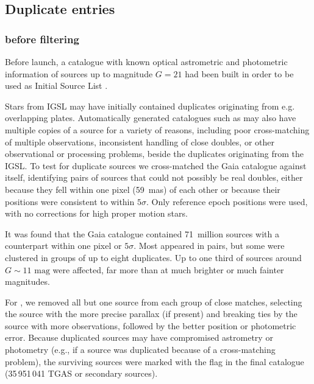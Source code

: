 \subsection{Duplicate entries}

\subsubsection{{} before filtering}\label{sec:duplicates}

Before launch, a catalogue with known optical astrometric and photometric information 
of sources up to magnitude $G=21$ had been built in order to be used as
Initial {\gaia} Source List \citep[IGSL,][]{2014A&A...570A..87S}.

Stars from IGSL may have initially contained duplicates originating from e.g. overlapping plates.
Automatically generated catalogues such as {} may also have multiple copies of a source for a variety of reasons, including poor cross-matching of multiple observations, inconsistent handling of close doubles, or other observational or processing problems, beside the duplicates originating from the IGSL. 
To test for duplicate sources we cross-matched the Gaia catalogue against itself, identifying pairs of sources that could not possibly be real doubles, either because they fell within one pixel (59~mas) of each other or because their positions were consistent to within $5\sigma$. Only reference epoch positions were used, with no corrections for high proper motion stars.

It was found that the {} Gaia catalogue contained 71~million sources 
with a counterpart within one pixel or $5\sigma$. 
Most appeared in pairs, but some were clustered in groups of up to eight duplicates. 
Up to one third of sources around $G \sim 11 \textrm{ mag}$ were affected, far more 
than at much brighter or much fainter magnitudes. 

For {}, we removed all but one source from each group of close matches, selecting the source with the more precise parallax (if present) and breaking ties by the source with  more observations, followed by the better position or photometric error. Because duplicated sources may have compromised astrometry or photometry (e.g., if a source was duplicated because of a cross-matching problem), the surviving sources were marked with the  flag in the final catalogue (35\,951\,041 TGAS or secondary sources).


